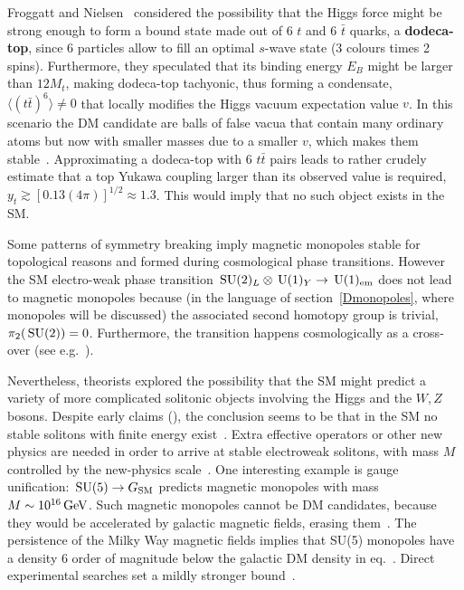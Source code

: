 \smallskip

Froggatt and Nielsen~\cite{EWsolitons} considered 
the possibility that the Higgs force might be strong enough to form
a bound state made out of 6 $t$ and 6 $\bar t$ quarks, a {\bf dodeca-top},
since $6$ particles allow to fill an  optimal $s$-wave state (3 colours times 2 spins).
Furthermore, they speculated that its binding energy $E_B$ might be larger than $12 M_t$, making dodeca-top tachyonic, thus forming a condensate, $\langle (t\bar t)^6\rangle\ne0$ that locally modifies the Higgs vacuum expectation value $v$. 
In this scenario the DM candidate are balls of false vacua that contain many ordinary atoms but now with smaller masses due to a smaller $v$, which makes them stable~\cite{EWsolitons}. 
Approximating a dodeca-top with 6 $t\bar t$ pairs leads  to rather crudely estimate that
a top Yukawa coupling  larger than its observed value is required,
$y_t \gtrsim  [0.13 (4\pi)]^{1/2} \approx 1.3 $. This would imply that no such object exists in the SM.

\smallskip

Some patterns of symmetry breaking 
imply magnetic monopoles stable for topological reasons and formed during cosmological phase transitions.
However the SM electro-weak phase transition $\,{\rm SU}(2)_L\otimes \,{\rm U}(1)_Y\to \,{\rm U}(1)_{\rm em}$ 
does not lead to magnetic monopoles because
(in the language of section~\ref{Dmonopoles}, where monopoles will be discussed)
the associated second homotopy group is trivial, $\pi_2(\,{\rm SU}(2))=0$.
Furthermore, the transition happens cosmologically as a cross-over (see e.g.~\cite{Anderson:1991zb}).

Nevertheless, theorists explored the possibility that the SM might predict 
a variety of more complicated solitonic objects involving the Higgs and the $W,Z$ bosons.
Despite early claims (), 
the conclusion seems to be that in the SM no stable solitons with finite energy exist~\cite{EWsolitons}.
Extra effective operators or other new physics are needed in order to arrive at stable electroweak solitons,
with mass $M$ controlled by the new-physics scale~\cite{EWsolitons}.
One interesting example is gauge unification: $\,{\rm SU}(5)\to G_{\rm SM}$ predicts magnetic monopoles with mass $M \sim 10^{16}\,{\rm GeV}$.
Such magnetic monopoles cannot be DM candidates, because they 
would be accelerated by galactic magnetic fields, erasing them~\cite{GUTmonopoles}.
The persistence of the Milky Way magnetic fields implies that SU(5) 
monopoles have a density 6 order of magnitude below the galactic DM density in eq.~\cite{GUTmonopoles}.
Direct experimental searches set a mildly stronger bound~\cite{GUTmonopoles}.

